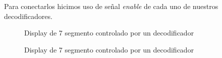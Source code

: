 \documentclass{mylib/reporteConCalif}
\begin{document}
Para conectarlos hicimos uso de señal \textit{enable} de cada uno de nuestros decodificadores.

\begin{figure}[H]%
    \centering
    \qquad
    \caption{Display de 7 segmento controlado por un decodificador}%
    \label{fig:example}%
\end{figure}

\begin{figure}[H]%
    \centering
    \qquad
    \caption{Display de 7 segmento controlado por un decodificador}%
    \label{fig:example}%
\end{figure}
\end{document}
